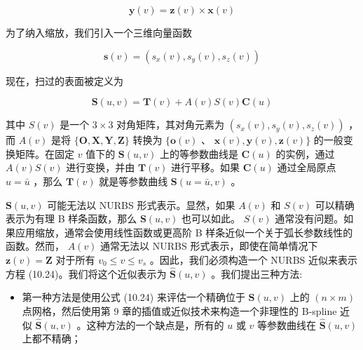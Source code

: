 \documentclass[../main.tex]{subfiles}
\begin{document}
\[
\mathbf{y}\left( v\right)  = \mathbf{z}\left( v\right)  \times  \mathbf{x}\left( v\right)  \tag{10.22}
\]

为了纳入缩放，我们引入一个三维向量函数

\[
\mathbf{s}\left( v\right)  = \left( {{s}_{x}\left( v\right) ,{s}_{y}\left( v\right) ,{s}_{z}\left( v\right) }\right)  \tag{10.23}
\]

现在，扫过的表面被定义为

\[
\mathbf{S}\left( {u,v}\right)  = \mathbf{T}\left( v\right)  + A\left( v\right) S\left( v\right) \mathbf{C}\left( u\right)  \tag{10.24}
\]

其中 \(S\left( v\right)\) 是一个 \(3 \times  3\) 对角矩阵，其对角元素为 \(\left( {{s}_{x}\left( v\right) ,{s}_{y}\left( v\right) ,{s}_{z}\left( v\right) }\right)\) ，而 \(A\left( v\right)\) 是将 \(\{ \mathbf{O},\mathbf{X},\mathbf{Y},\mathbf{Z}\}\) 转换为 \(\{ \mathbf{o}\left( v\right)\) 、 \(\mathbf{x}\left( v\right) ,\mathbf{y}\left( v\right) ,\mathbf{z}\left( v\right) \}\) 的一般变换矩阵。在固定 \(v\) 值下的 \(\mathbf{S}\left( {u,v}\right)\) 上的等参数曲线是 \(\mathbf{C}\left( u\right)\) 的实例，通过 \(A\left( v\right) S\left( v\right)\) 进行变换，并由 \(\mathbf{T}\left( v\right)\) 进行平移。如果 \(\mathbf{C}\left( u\right)\) 通过全局原点 \(u = \bar{u}\) ，那么 \(\mathbf{T}\left( v\right)\) 就是等参数曲线 \(\mathbf{S}\left( {u = \bar{u},v}\right)\) 。

\(\mathbf{S}\left( {u,v}\right)\) 可能无法以 NURBS 形式表示。显然，如果 \(A\left( v\right)\) 和 \(S\left( v\right)\) 可以精确表示为有理 B 样条函数，那么 \(\mathbf{S}\left( {u,v}\right)\) 也可以如此。 \(S\left( v\right)\) 通常没有问题。如果应用缩放，通常会使用线性函数或更高阶 B 样条近似一个关于弧长参数线性的函数。然而， \(A\left( v\right)\) 通常无法以 NURBS 形式表示，即使在简单情况下 \(\mathbf{z}\left( v\right)  = \mathbf{Z}\) 对于所有 \({v}_{0} \leq  v \leq  {v}_{s}\) 。因此，我们必须构造一个 NURBS 近似来表示方程 (10.24)。我们将这个近似表示为 \(\widehat{\mathbf{S}}\left( {u,v}\right)\) 。我们提出三种方法:

\begin{itemize}
\item 第一种方法是使用公式 (10.24) 来评估一个精确位于 \(\mathbf{S}\left( {u,v}\right)\) 上的 \(\left( {n \times  m}\right)\) 点网格，然后使用第 9 章的插值或近似技术来构造一个非理性的 B-spline 近似 \(\widehat{\mathbf{S}}\left( {u,v}\right)\) 。这种方法的一个缺点是，所有的 \(u\) 或 \(v\) 等参数曲线在 \(\widehat{\mathbf{S}}\left( {u,v}\right)\) 上都不精确；
\end{itemize}
\end{document}
